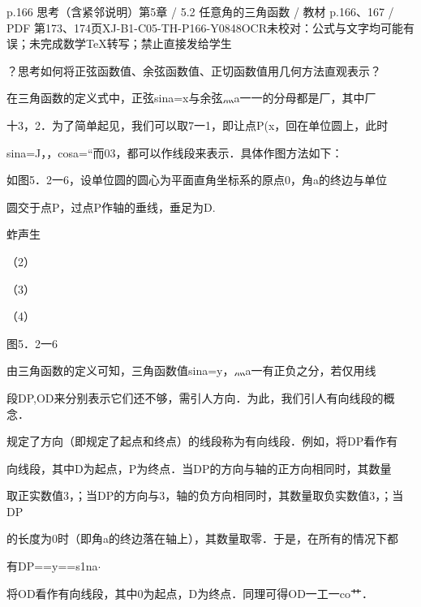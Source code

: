 \begin{bankitem}{p.166 思考（含紧邻说明）}{第5章 / 5.2 任意角的三角函数 / 教材 p.166、167 / PDF 第173、174页}{XJ-B1-C05-TH-P166-Y0848}{OCR未校对：公式与文字均可能有误；未完成数学TeX转写；禁止直接发给学生}
\begin{ocrdraft}
\par
？思考如何将正弦函数值、余弦函数值、正切函数值用几何方法直观表示？
\par
在三角函数的定义式中，正弦sina=x与余弦灬a一一的分母都是厂，其中厂
\par
十3，2．为了简单起见，我们可以取7一1，即让点P(x，回在单位圆上，此时
\par
sina=J，，cosa=“而03，都可以作线段来表示．具体作图方法如下：
\par
如图5．2一6，设单位圆的圆心为平面直角坐标系的原点0，角a的终边与单位
\par
圆交于点P，过点P作轴的垂线，垂足为D.
\par
蚱声生
\par
（2）
\par
（3）
\par
（4）
\par
图5．2一6
\par
由三角函数的定义可知，三角函数值sina=y，灬a一有正负之分，若仅用线
\par
段DP,OD来分别表示它们还不够，需引人方向．为此，我们引人有向线段的概念．
\par
规定了方向（即规定了起点和终点）的线段称为有向线段．例如，将DP看作有
\par
向线段，其中D为起点，P为终点．当DP的方向与轴的正方向相同时，其数量
\par
取正实数值3，；当DP的方向与3，轴的负方向相同时，其数量取负实数值3，；当DP
\par
[教材p.167 / PDF第174页]
\par
的长度为0时（即角a的终边落在轴上），其数量取零．于是，在所有的情况下都
\par
有DP==y==s1na\ensuremath{\cdot}
\par
将OD看作有向线段，其中0为起点，D为终点．同理可得OD一工一co艹．
\par

\end{ocrdraft}
\end{bankitem}
